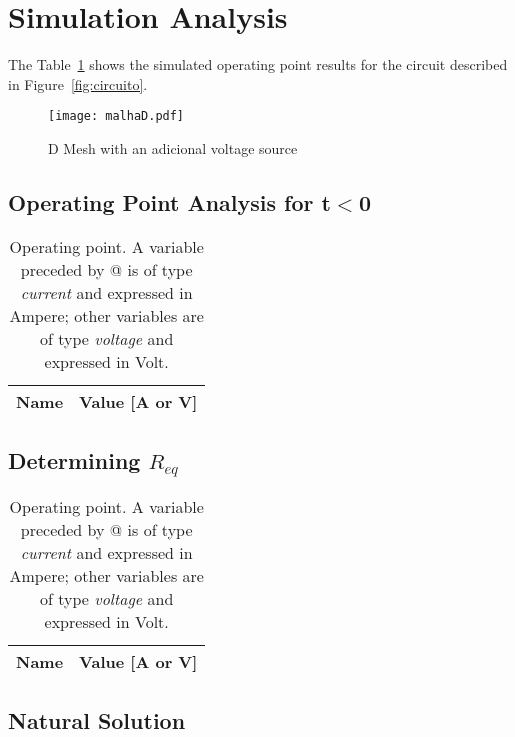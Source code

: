 \section{Simulation Analysis}
\label{sec:simulation}


The Table~\ref{tab:op1} shows the simulated operating point results for the circuit described in Figure~\ref{fig:circuito}.

\begin{figure}[H] \centering
\texttt{[image: malhaD.pdf]}
\caption{D Mesh with an adicional voltage source} %
\label{fig:malhaD}
\end{figure}


\subsection{Operating Point Analysis for t$<$0}

\begin{table}[H]
  \centering
  \begin{tabular}{|l|r|}
    \hline    
    {\bf Name} & {\bf Value [A or V]} \\ \hline
    
  \end{tabular}
  \caption{Operating point. A variable preceded by @ is of type {\em current}
    and expressed in Ampere; other variables are of type {\it voltage} and expressed in
    Volt.}
  \label{tab:op1}
\end{table}

\subsection{Determining $R_{eq}$}

\begin{table}[H]
  \centering
  \begin{tabular}{|l|r|}
    \hline    
    {\bf Name} & {\bf Value [A or V]} \\ \hline
    
  \end{tabular}
  \caption{Operating point. A variable preceded by @ is of type {\em current}
    and expressed in Ampere; other variables are of type {\it voltage} and expressed in
    Volt.}
  \label{tab:op2}
\end{table}

\subsection{Natural Solution}

